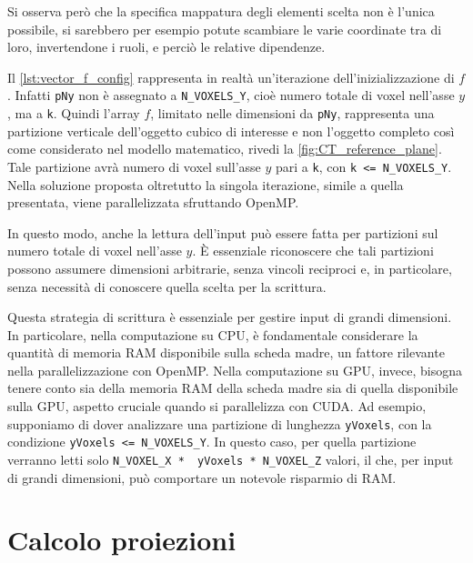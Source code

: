\documentclass[12pt,a4paper]{report}
\begin{document}
Si osserva però che la specifica mappatura degli elementi scelta non è l'unica possibile, si sarebbero per esempio potute
scambiare le varie coordinate tra di loro, invertendone i ruoli, e perciò le relative dipendenze.

Il \autoref{lst:vector_f_config} rappresenta in realtà un'iterazione dell'inizializzazione di \(f\).
Infatti \lstinline{pNy} non è assegnato a \mbox{\lstinline{N_VOXELS_Y},} cioè numero totale di voxel nell'asse \(y\), ma a
\mbox{\lstinline{k}.}
Quindi l'array \(f\), limitato nelle dimensioni da \mbox{\lstinline{pNy},} rappresenta una partizione verticale dell'oggetto
cubico di interesse e non l'oggetto completo così come considerato nel modello matematico, rivedi la
\autoref{fig:CT_reference_plane}.
Tale partizione avrà numero di voxel sull'asse \(y\) pari a \mbox{\lstinline{k},} con \mbox{\lstinline{k <= N_VOXELS_Y}.}
Nella soluzione proposta oltretutto la singola iterazione, simile a quella presentata, viene parallelizzata sfruttando OpenMP.

In questo modo, anche la lettura dell'input può essere fatta per partizioni sul numero totale di voxel nell'asse \(y\).
È essenziale riconoscere che tali partizioni possono assumere dimensioni arbitrarie, senza vincoli reciproci e, in particolare,
senza necessità di conoscere quella scelta per la scrittura.

Questa strategia di scrittura è essenziale per gestire input di grandi dimensioni.
In particolare, nella computazione su CPU, è fondamentale considerare la quantità di memoria RAM disponibile sulla scheda madre,
un fattore rilevante nella parallelizzazione con OpenMP.
Nella computazione su GPU, invece, bisogna tenere conto sia della memoria RAM della scheda madre sia di quella disponibile sulla
GPU, aspetto cruciale quando si parallelizza con CUDA.
Ad esempio, supponiamo di dover analizzare una partizione di lunghezza \mbox{\lstinline{yVoxels},} con la condizione
\mbox{\lstinline{yVoxels <= N_VOXELS_Y}.}
In questo caso, per quella partizione verranno letti solo \lstinline{N_VOXEL_X *  yVoxels * N_VOXEL_Z} valori, il che, per input
di grandi dimensioni, può comportare un notevole risparmio di RAM.

\section{Calcolo proiezioni}
\end{document}
